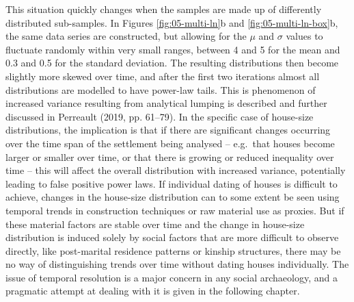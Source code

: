 \documentclass[
  12pt,
]{book}
\begin{document}
This situation quickly changes when the samples are made up of differently distributed sub-samples. In Figures \ref{fig:05-multi-ln}b and \ref{fig:05-multi-ln-box}b, the same data series are constructed, but allowing for the \(\mu\) and \(\sigma\) values to fluctuate randomly within very small ranges, between 4 and 5 for the mean and 0.3 and 0.5 for the standard deviation. The resulting distributions then become slightly more skewed over time, and after the first two iterations almost all distributions are modelled to have power-law tails. This is phenomenon of increased variance resulting from analytical lumping is described and further discussed in Perreault (2019, pp. 61--79). In the specific case of house-size distributions, the implication is that if there are significant changes occurring over the time span of the settlement being analysed -- e.g.~that houses become larger or smaller over time, or that there is growing or reduced inequality over time -- this will affect the overall distribution with increased variance, potentially leading to false positive power laws. If individual dating of houses is difficult to achieve, changes in the house-size distribution can to some extent be seen using temporal trends in construction techniques or raw material use as proxies. But if these material factors are stable over time and the change in house-size distribution is induced solely by social factors that are more difficult to observe directly, like post-marital residence patterns or kinship structures, there may be no way of distinguishing trends over time without dating houses individually. The issue of temporal resolution is a major concern in any social archaeology, and a pragmatic attempt at dealing with it is given in the following chapter.
\end{document}
